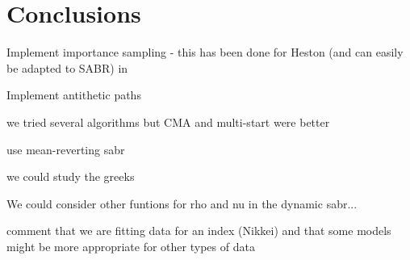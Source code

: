 
\chapter{Conclusions}
\label{chapter:conclusions}
Implement importance sampling - this has been done for Heston (and can easily be adapted to SABR) in \cite{Stilger}

Implement antithetic paths

we tried several algorithms but CMA and multi-start were better


use mean-reverting sabr

we could study the greeks

We could consider other funtions for rho and nu in the dynamic sabr...

comment that we are fitting data for an index (Nikkei) and that some models might be more appropriate for other types of data
